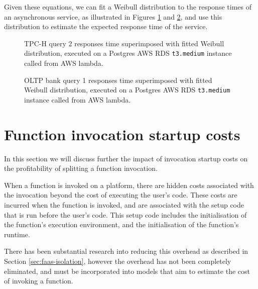 Given these equations, we can fit a Weibull distribution to the response times of an asynchronous service, as illustrated in Figures \ref{fig:tpch-q2-weibull} and \ref{fig:oltp-q1-weibull}, and use this distribution to estimate the expected response time of the service.

\begin{figure}
    \begin{center}
        
    \end{center}
    \caption{TPC-H query 2 responses time superimposed with fitted Weibull distribution, executed on a Postgres AWS RDS \texttt{t3.medium} instance called from AWS lambda.}
    \label{fig:tpch-q2-weibull}
\end{figure}

\begin{figure}
    \begin{center}
        
    \end{center}
    \caption{OLTP bank query 1 responses time superimposed with fitted Weibull distribution, executed on a Postgres AWS RDS \texttt{t3.medium} instance called from AWS lambda.}
    \label{fig:oltp-q1-weibull}
\end{figure}

\section{Function invocation startup costs}
\label{sec:faas-function-invocation-startup-costs}
In this section we will discuss further the impact of invocation startup costs on the profitability of splitting a function invocation.

When a function is invoked on a \faas{} platform, there are hidden costs associated with the invocation beyond the cost of executing the user's code. These costs are incurred when the function is invoked, and are associated with the setup code that is run before the user's code. This setup code includes the initialisation of the function's execution environment, and the initialisation of the function's runtime.

There has been substantial research into reducing this overhead as described in Section \ref{sec:faas-isolation}, however the overhead has not been completely eliminated, and must be incorporated into models that aim to estimate the cost of invoking a function.

